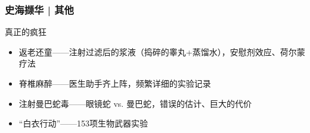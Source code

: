 \begin{frame}
  \frametitle{史海撷华 | 其他}
  \begin{block}{真正的疯狂}
    \begin{itemize}
      \item 返老还童——注射过滤后的浆液（捣碎的睾丸+蒸馏水），安慰剂效应、荷尔蒙疗法
      \item 脊椎麻醉——医生助手齐上阵，频繁详细的实验记录
      \item 注射曼巴蛇毒——眼镜蛇 vs. 曼巴蛇，错误的估计、巨大的代价
      \item “白衣行动”——153项生物武器实验
    \end{itemize}
  \end{block}
\end{frame}



